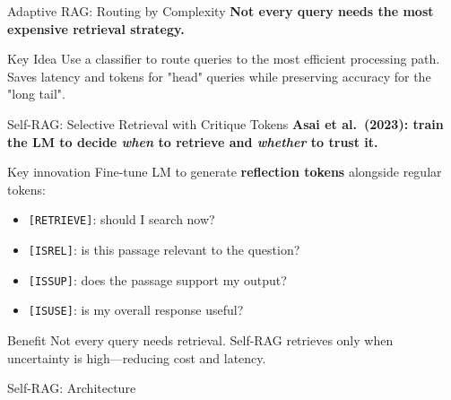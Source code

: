 \documentclass[aspectratio=169, xcolor=table]{beamer}
\newif\ifanimated
\newcommand{\cpause}{\ifanimated\pause\fi}
\begin{document}
\begin{frame}[shrink=10]{Adaptive RAG: Routing by Complexity}
\textbf{Not every query needs the most expensive retrieval strategy.}

\vspace{0.8em}
\begin{center}
\resizebox{0.8\textwidth}{!}{

}
\end{center}

\cpause
\begin{block}{Key Idea}
Use a classifier to route queries to the most efficient processing path.
Saves latency and tokens for "head" queries while preserving accuracy for the "long tail".
\end{block}
\end{frame}

\begin{frame}{Self-RAG: Selective Retrieval with Critique Tokens}
\textbf{Asai et al.\ (2023): train the LM to decide \emph{when} to retrieve and \emph{whether} to trust it.}

\vspace{0.8em}
\begin{block}{Key innovation}
Fine-tune LM to generate \textbf{reflection tokens} alongside regular tokens:
\begin{itemize}
  \item \texttt{[RETRIEVE]}: should I search now?
  \item \texttt{[ISREL]}: is this passage relevant to the question?
  \item \texttt{[ISSUP]}: does the passage support my output?
  \item \texttt{[ISUSE]}: is my overall response useful?
\end{itemize}
\end{block}

\cpause
\vspace{0.5em}
\begin{block}{Benefit}
Not every query needs retrieval.
Self-RAG retrieves only when uncertainty is high---reducing cost and latency.
\end{block}
\end{frame}

\begin{frame}{Self-RAG: Architecture}
\begin{center}
\resizebox{0.8\textwidth}{!}{

}
\end{center}
\end{frame}
\end{document}
